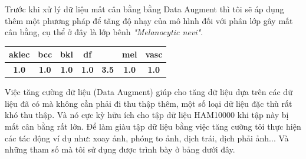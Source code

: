 \documentclass[12pt,a4paper]{article}
\begin{document}
	\noindent
	Trước khi xử lý dữ liệu mất cân bằng bằng Data Augment thì tôi sẽ áp dụng thêm một phương pháp để tăng độ nhạy của mô hình đối với phân lớp gây mất cân bằng, cụ thể ở đây là lớp bênh \textit{"Melanocytic nevi"}.\\
	
	\begin{center}
		\begin{tabular}{|c|c|c|c|c|c|c|}
			\hline
			\rowcolor[HTML]{000000} 
			{\color[HTML]{FFFFFF} \textbf{akiec}} & {\color[HTML]{FFFFFF} \textbf{bcc}} & {\color[HTML]{FFFFFF} \textbf{bkl}} & {\color[HTML]{FFFFFF} \textbf{df}} & \cellcolor[HTML]{FE0000}{\color[HTML]{FFFFFF} \textbf{nv}} & {\color[HTML]{FFFFFF} \textbf{mel}} & {\color[HTML]{FFFFFF} \textbf{vasc}} \\ \hline
			\textbf{1.0}                          & \textbf{1.0}                        & \textbf{1.0}                        & \textbf{1.0}                       & \cellcolor[HTML]{F8FF00}\textbf{3.5}                       & \textbf{1.0}                        & \textbf{1.0}                         \\ \hline
		\end{tabular}
	\end{center}
	
	\noindent
	Việc tăng cường dữ liệu (Data Augment) giúp cho tăng dữ liệu dựa trên các dữ liệu đã có mà không cần phải đi thu thập thêm, một số loại dữ liệu đặc thù rất khó thu thập. Và nó cực kỳ hữu ích cho tập dữ liệu HAM10000 khi tập này bị mất cân bằng rất lớn. Để làm giàu tập dữ liệu bằng việc tăng cường tôi thực hiện các tác động ví dụ như: xoay ảnh, phóng to ảnh, dịch trái, dịch phải ảnh... Và những tham số mà tôi sử dụng được trình bày ở bảng dưới đây.
	
\end{document}
